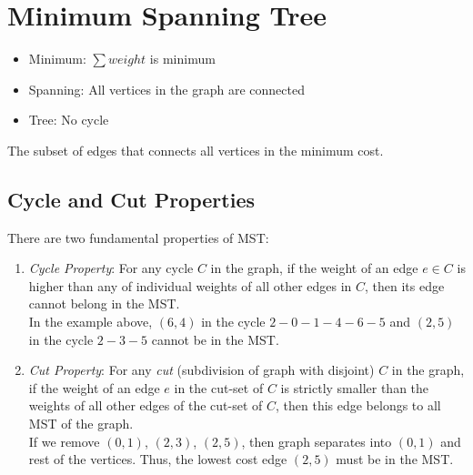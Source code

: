 \section{Minimum Spanning Tree}

\begin{itemize}
  \item Minimum: $\sum weight$ is minimum
  \item Spanning: All vertices in the graph are connected
  \item Tree: No cycle
\end{itemize}

\noindent The subset of edges that connects all vertices in the minimum cost.

\subsection{Cycle and Cut Properties}


There are two fundamental properties of MST:

\begin{enumerate}
  \item \textit{Cycle Property}: For any cycle $C$ in the graph, if the weight of an edge $e \in C$ is higher than any of individual weights of all other edges in $C$, then its edge cannot belong in the MST.\\
    In the example above, $(6, 4)$ in the cycle $2-0-1-4-6-5$ and $(2, 5)$ in the cycle $2-3-5$ cannot be in the MST.
  \item \textit{Cut Property}: For any \textit{cut} (subdivision of graph with disjoint) $C$ in the graph, if the weight of an edge $e$ in the cut-set of $C$ is strictly smaller than the weights of all other edges of the cut-set of $C$, then this edge belongs to all MST of the graph.\\
    If we remove $(0,1)$, $(2,3)$, $(2,5)$, then graph separates into $(0,1)$ and rest of the vertices. Thus, the lowest cost edge $(2, 5)$ must be in the MST.
\end{enumerate}

